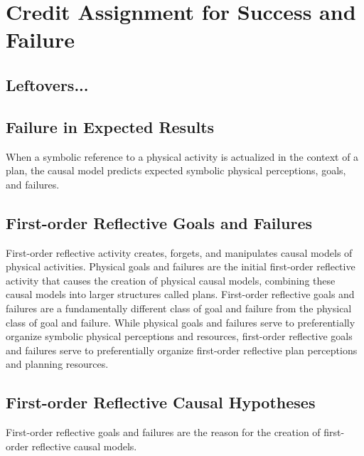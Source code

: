 \chapter{Credit Assignment for Success and Failure}
\label{chapter:credit_assignment_for_success_and_failure}



\section{Leftovers...}

\section{Failure in Expected Results}

When a symbolic reference to a physical activity is actualized in the
context of a plan, the causal model predicts expected symbolic
physical perceptions, goals, and failures.

\section{First-order Reflective Goals and Failures}

First-order reflective activity creates, forgets, and manipulates
causal models of physical activities.  Physical goals and failures are
the initial first-order reflective activity that causes the creation
of physical causal models, combining these causal models into larger
structures called plans.  First-order reflective goals and failures
are a fundamentally different class of goal and failure from the
physical class of goal and failure.  While physical goals and failures
serve to preferentially organize symbolic physical perceptions and
resources, first-order reflective goals and failures serve to
preferentially organize first-order reflective plan perceptions and
planning resources.

\section{First-order Reflective Causal Hypotheses}

First-order reflective goals and failures are the reason for the
creation of first-order reflective causal models.



